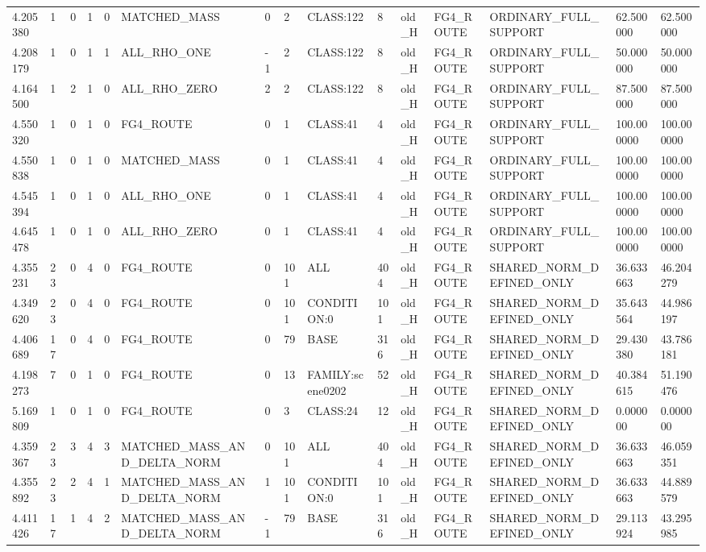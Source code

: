 \begin{tabular}{lllllllllllllll}
4.205380 & 1 & 0 & 1 & 0 & MATCHED\_MASS & 0 & 2 & CLASS:122 & 8 & old\_H & FG4\_ROUTE & ORDINARY\_FULL\_SUPPORT & 62.500000 & 62.500000 \\
4.208179 & 1 & 0 & 1 & 1 & ALL\_RHO\_ONE & -1 & 2 & CLASS:122 & 8 & old\_H & FG4\_ROUTE & ORDINARY\_FULL\_SUPPORT & 50.000000 & 50.000000 \\
4.164500 & 1 & 2 & 1 & 0 & ALL\_RHO\_ZERO & 2 & 2 & CLASS:122 & 8 & old\_H & FG4\_ROUTE & ORDINARY\_FULL\_SUPPORT & 87.500000 & 87.500000 \\
4.550320 & 1 & 0 & 1 & 0 & FG4\_ROUTE & 0 & 1 & CLASS:41 & 4 & old\_H & FG4\_ROUTE & ORDINARY\_FULL\_SUPPORT & 100.000000 & 100.000000 \\
4.550838 & 1 & 0 & 1 & 0 & MATCHED\_MASS & 0 & 1 & CLASS:41 & 4 & old\_H & FG4\_ROUTE & ORDINARY\_FULL\_SUPPORT & 100.000000 & 100.000000 \\
4.545394 & 1 & 0 & 1 & 0 & ALL\_RHO\_ONE & 0 & 1 & CLASS:41 & 4 & old\_H & FG4\_ROUTE & ORDINARY\_FULL\_SUPPORT & 100.000000 & 100.000000 \\
4.645478 & 1 & 0 & 1 & 0 & ALL\_RHO\_ZERO & 0 & 1 & CLASS:41 & 4 & old\_H & FG4\_ROUTE & ORDINARY\_FULL\_SUPPORT & 100.000000 & 100.000000 \\
4.355231 & 23 & 0 & 4 & 0 & FG4\_ROUTE & 0 & 101 & ALL & 404 & old\_H & FG4\_ROUTE & SHARED\_NORM\_DEFINED\_ONLY & 36.633663 & 46.204279 \\
4.349620 & 23 & 0 & 4 & 0 & FG4\_ROUTE & 0 & 101 & CONDITION:0 & 101 & old\_H & FG4\_ROUTE & SHARED\_NORM\_DEFINED\_ONLY & 35.643564 & 44.986197 \\
4.406689 & 17 & 0 & 4 & 0 & FG4\_ROUTE & 0 & 79 & BASE & 316 & old\_H & FG4\_ROUTE & SHARED\_NORM\_DEFINED\_ONLY & 29.430380 & 43.786181 \\
4.198273 & 7 & 0 & 1 & 0 & FG4\_ROUTE & 0 & 13 & FAMILY:scene0202 & 52 & old\_H & FG4\_ROUTE & SHARED\_NORM\_DEFINED\_ONLY & 40.384615 & 51.190476 \\
5.169809 & 1 & 0 & 1 & 0 & FG4\_ROUTE & 0 & 3 & CLASS:24 & 12 & old\_H & FG4\_ROUTE & SHARED\_NORM\_DEFINED\_ONLY & 0.000000 & 0.000000 \\
4.359367 & 23 & 3 & 4 & 3 & MATCHED\_MASS\_AND\_DELTA\_NORM & 0 & 101 & ALL & 404 & old\_H & FG4\_ROUTE & SHARED\_NORM\_DEFINED\_ONLY & 36.633663 & 46.059351 \\
4.355892 & 23 & 2 & 4 & 1 & MATCHED\_MASS\_AND\_DELTA\_NORM & 1 & 101 & CONDITION:0 & 101 & old\_H & FG4\_ROUTE & SHARED\_NORM\_DEFINED\_ONLY & 36.633663 & 44.889579 \\
4.411426 & 17 & 1 & 4 & 2 & MATCHED\_MASS\_AND\_DELTA\_NORM & -1 & 79 & BASE & 316 & old\_H & FG4\_ROUTE & SHARED\_NORM\_DEFINED\_ONLY & 29.113924 & 43.295985 \\

\end{tabular}
